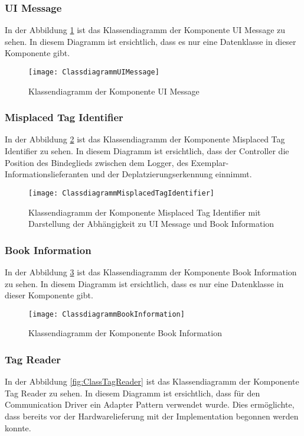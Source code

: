 \subsubsection{UI Message}
In der Abbildung \ref{fig:ClassUIMessage} ist das Klassendiagramm der Komponente UI Message zu sehen.
In diesem Diagramm ist ersichtlich, dass es nur eine Datenklasse in dieser Komponente gibt.
\begin{figure}[htb]
	\centering
	\texttt{[image: ClassdiagrammUIMessage]}
	\caption{Klassendiagramm der Komponente UI Message}
	\label{fig:ClassUIMessage}
\end{figure}

\clearpage
\subsubsection{Misplaced Tag Identifier}
In der Abbildung \ref{fig:ClassMisplacedTagIdentifier} ist das Klassendiagramm der Komponente Misplaced Tag Identifier zu sehen.
In diesem Diagramm ist ersichtlich, dass der Controller die Position des Bindeglieds zwischen dem Logger, des Exemplar-Informationslieferanten und der Deplatzierungserkennung einnimmt.
\begin{figure}[htb]
	\centering
	\texttt{[image: ClassdiagrammMisplacedTagIdentifier]}
	\caption{Klassendiagramm der Komponente Misplaced Tag Identifier mit Darstellung der Abhängigkeit zu UI Message und Book Information}
	\label{fig:ClassMisplacedTagIdentifier}
\end{figure}

\subsubsection{Book Information}
In der Abbildung \ref{fig:ClassBookInformation} ist das Klassendiagramm der Komponente Book Information zu sehen.
In diesem Diagramm ist ersichtlich, dass es nur eine Datenklasse in dieser Komponente gibt.
\begin{figure}[htb]
	\centering
	\texttt{[image: ClassdiagrammBookInformation]}
	\caption{Klassendiagramm der Komponente Book Information}
	\label{fig:ClassBookInformation}
\end{figure}

\subsubsection{Tag Reader}
In der Abbildung \ref{fig:ClassTagReader} ist das Klassendiagramm der Komponente Tag Reader zu sehen.
In diesem Diagramm ist ersichtlich, dass für den Communication Driver ein Adapter Pattern verwendet wurde. Dies ermöglichte, dass bereits vor der Hardwarelieferung mit der Implementation begonnen werden konnte. 

